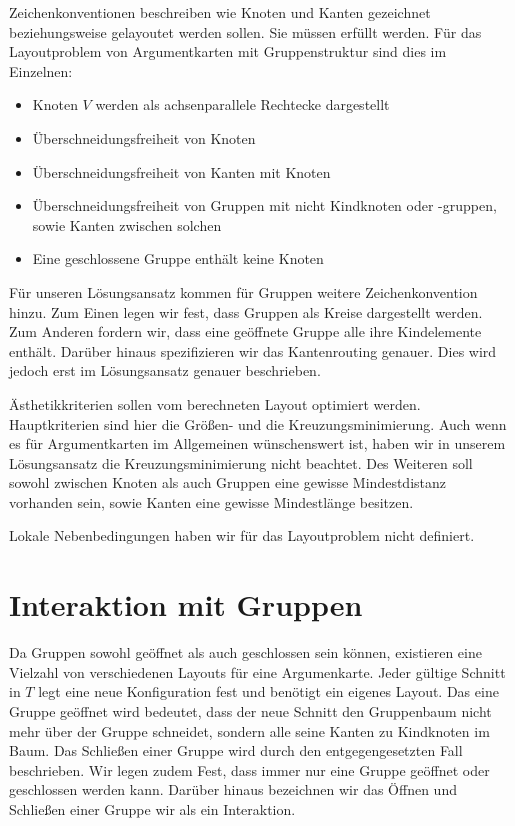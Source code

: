 Zeichenkonventionen beschreiben wie Knoten und Kanten gezeichnet beziehungsweise gelayoutet werden sollen. Sie müssen erfüllt werden.
Für das Layoutproblem von Argumentkarten mit Gruppenstruktur sind dies im Einzelnen:
\begin{itemize}
\item Knoten $V$ werden als achsenparallele Rechtecke dargestellt
\item Überschneidungsfreiheit von Knoten
\item Überschneidungsfreiheit von Kanten mit Knoten
\item Überschneidungsfreiheit von Gruppen mit nicht Kindknoten oder -gruppen, sowie Kanten zwischen solchen
\item Eine geschlossene Gruppe enthält keine Knoten
\end{itemize}

Für unseren Lösungsansatz kommen für Gruppen weitere Zeichenkonvention hinzu. Zum Einen legen wir fest, dass Gruppen
als Kreise dargestellt werden. Zum Anderen fordern wir, dass eine geöffnete Gruppe alle ihre Kindelemente enthält. 
Darüber hinaus spezifizieren wir das Kantenrouting genauer. Dies wird jedoch erst im Lösungsansatz genauer beschrieben.

Ästhetikkriterien sollen vom berechneten Layout optimiert werden. Hauptkriterien sind hier die Größen- und die Kreuzungsminimierung.
Auch wenn es für Argumentkarten im Allgemeinen wünschenswert ist, haben wir in unserem Lösungsansatz die Kreuzungsminimierung nicht beachtet.
Des Weiteren soll sowohl zwischen Knoten als auch Gruppen eine gewisse Mindestdistanz vorhanden sein, sowie Kanten eine gewisse Mindestlänge besitzen.

Lokale Nebenbedingungen haben wir für das Layoutproblem nicht definiert.


\section{Interaktion mit Gruppen}
Da Gruppen sowohl geöffnet als auch geschlossen sein können, existieren eine Vielzahl von verschiedenen Layouts für eine Argumenkarte.
Jeder gültige Schnitt in $T$ legt eine neue Konfiguration fest und benötigt ein eigenes Layout. 
Das eine Gruppe geöffnet wird bedeutet, dass der neue Schnitt den Gruppenbaum nicht mehr über der Gruppe schneidet, sondern alle seine Kanten zu Kindknoten im Baum.
Das Schließen einer Gruppe wird durch den entgegengesetzten Fall beschrieben. Wir legen zudem Fest, dass immer nur eine Gruppe geöffnet oder geschlossen werden kann. Darüber hinaus bezeichnen wir das Öffnen und Schließen einer Gruppe wir als ein Interaktion.

